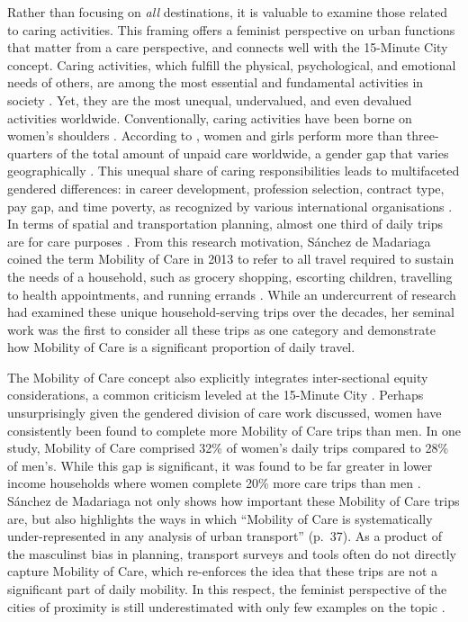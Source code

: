 \documentclass[
  authoryear,
  preprint,
  3p]{elsarticle}
\begin{document}
Rather than focusing on \emph{all} destinations, it is valuable to
examine those related to caring activities. This framing offers a
feminist perspective on urban functions that matter from a care
perspective, and connects well with the 15-Minute City concept. Caring
activities, which fulfill the physical, psychological, and emotional
needs of others, are among the most essential and fundamental activities
in society \citep{ilo_care_2018}. Yet, they are the most unequal,
undervalued, and even devalued activities worldwide. Conventionally,
caring activities have been borne on women's shoulders
\citep{haydenGrandDomesticRevolution1982, hochschild_second_2012}.
According to \citet{ilo_care_2018}, women and girls perform more than
three-quarters of the total amount of unpaid care worldwide, a gender
gap that varies geographically \citep{RN5}. This unequal share of caring
responsibilities leads to multifaceted gendered differences: in career
development, profession selection, contract type, pay gap, and time
poverty, as recognized by various international organisations
\citep{EIGE2016, ilo_care_2018}. In terms of spatial and transportation
planning, almost one third of daily trips are for care purposes
\citep{sanchezdemadariagaMobilityCareIntroducing2013, sanchezdemadariagaMeasuringMobilitiesCare2019, ravensbergen2023exploratory}.
From this research motivation, Sánchez de Madariaga coined the term
Mobility of Care in 2013 to refer to all travel required to sustain the
needs of a household, such as grocery shopping, escorting children,
travelling to health appointments, and running errands
\citep{sanchezdemadariagaMobilityCareIntroducing2013}. While an
undercurrent of research had examined these unique household-serving
trips over the decades, her seminal work was the first to consider all
these trips as one category and demonstrate how Mobility of Care is a
significant proportion of daily travel.

The Mobility of Care concept also explicitly integrates inter-sectional
equity considerations, a common criticism leveled at the 15-Minute City
\citep{guzmanProximityEnoughCritical2024}. Perhaps unsurprisingly given
the gendered division of care work discussed, women have consistently
been found to complete more Mobility of Care trips than men. In one
study, Mobility of Care comprised 32\% of women's daily trips compared
to 28\% of men's. While this gap is significant, it was found to be far
greater in lower income households where women complete 20\% more care
trips than men \citep{ravensbergen2023exploratory}. Sánchez de Madariaga
not only shows how important these Mobility of Care trips are, but also
highlights the ways in which ``Mobility of Care is systematically
under-represented in any analysis of urban transport'' (p.~37). As a
product of the masculinst bias in planning, transport surveys and tools
often do not directly capture Mobility of Care, which re-enforces the
idea that these trips are not a significant part of daily mobility. In
this respect, the feminist perspective of the cities of proximity is
still underestimated with only few examples on the topic
\citep{gil_sola_choose_2022, macintyre_her_2022}.
\end{document}
